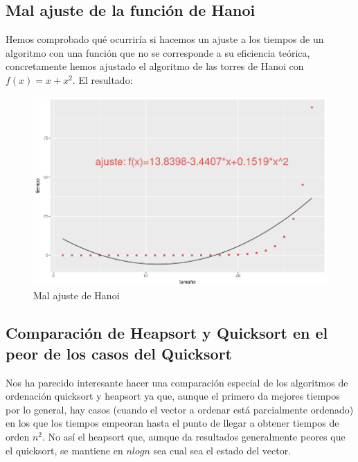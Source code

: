 \documentclass[a4paper, 11pt]{article}
\begin{document}
\subsection{Mal ajuste de la función de Hanoi}
Hemos comprobado qué ocurriría si hacemos un ajuste a los tiempos de un algoritmo con una función que no se corresponde a su eficiencia teórica, concretamente hemos ajustado el algoritmo de las torres de Hanoi con $f(x)=x+x^2$. El resultado:
\begin{figure}[!hbp]
	\includegraphics[width=\textwidth]{hanoibad.png}
	\caption{Mal ajuste de Hanoi \label{hanoibad}}
\end{figure}

\subsection{Comparación de Heapsort y Quicksort en el peor de los casos del Quicksort}
Nos ha parecido interesante hacer una comparación especial de los algoritmos de ordenación quicksort y heapsort ya que, aunque el primero da mejores tiempos por lo general, hay casos (cuando el vector a ordenar está parcialmente ordenado) en los que los tiempos empeoran hasta el punto de llegar a obtener tiempos de orden $n^2$. No así el heapsort que, aunque da resultados generalmente peores que el quicksort, se mantiene en $nlogn$ sea cual sea el estado del vector.
\end{document}
